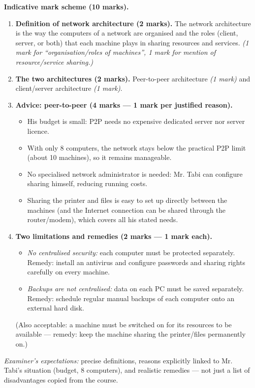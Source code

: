 \documentclass[11pt]{article}
\newcommand{\cle}[1]{{\popxbold\color{popdark}#1}}
\begin{document}
\begin{corrige}
\textbf{Indicative mark scheme (10 marks).}
\begin{enumerate}
\item \textbf{Definition of network architecture (2 marks).} The network architecture is the way the computers of a network are organised and the roles (\cle{client}, \cle{server}, or both) that each machine plays in sharing resources and services. \emph{(1 mark for ``organisation/roles of machines'', 1 mark for mention of resource/service sharing.)}
\item \textbf{The two architectures (2 marks).} \cle{Peer-to-peer} architecture \emph{(1 mark)} and \cle{client/server} architecture \emph{(1 mark)}.
\item \textbf{Advice: peer-to-peer (4 marks — 1 mark per justified reason).}
\begin{itemize}
\item His budget is small: P2P needs no expensive dedicated server nor server licence.
\item With only 8 computers, the network stays below the practical P2P limit (about 10 machines), so it remains manageable.
\item No specialised network administrator is needed: Mr. Tabi can configure sharing himself, reducing running costs.
\item Sharing the printer and files is easy to set up directly between the machines (and the Internet connection can be shared through the router/modem), which covers all his stated needs.
\end{itemize}
\item \textbf{Two limitations and remedies (2 marks — 1 mark each).}
\begin{itemize}
\item \emph{No centralised security:} each computer must be protected separately. Remedy: install an antivirus and configure passwords and sharing rights carefully on every machine.
\item \emph{Backups are not centralised:} data on each PC must be saved separately. Remedy: schedule regular manual backups of each computer onto an external hard disk.
\end{itemize}
(Also acceptable: a machine must be switched on for its resources to be available — remedy: keep the machine sharing the printer/files permanently on.)
\end{enumerate}
\emph{Examiner's expectations:} precise definitions, reasons explicitly linked to Mr. Tabi's situation (budget, 8 computers), and realistic remedies — not just a list of disadvantages copied from the course.
\end{corrige}
\end{document}
